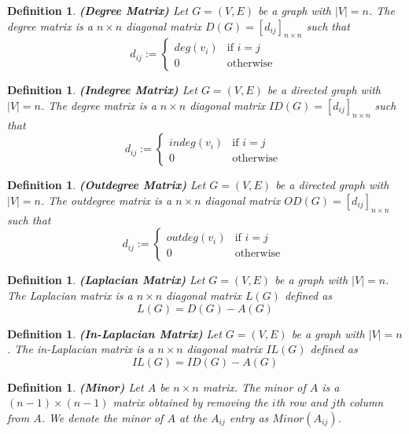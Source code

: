 \documentclass[twoside,11pt]{article}
\newtheorem{definition}[theorem]{Definition}
\numberwithin{equation}{section} \DeclareMathOperator{\Var}{Var}
\newcommand{\bdf}{\begin{definition}}
\newcommand{\edf}{\end{definition}}
\begin{document}
\bdf
{\bf (Degree Matrix)}
Let $G=(V,E)$ be a graph with $|V|=n$. The {\it degree matrix} is a $n\times n$ diagonal matrix $D(G) = [d_{ij}]_{n \times n}$ such that
\begin{displaymath}
d_{ij} :=  \left\{\begin{array}{ll} deg(v_i) & \textrm{if $i=j$ }
 \\ 0 & \textrm{otherwise }
\end{array}\right.
\end{displaymath}
\edf

\bdf
{\bf (Indegree Matrix)}
Let $G=(V,E)$ be a directed graph with $|V|=n$. The {\it degree matrix} is a $n\times n$ diagonal matrix $ID(G) = [d_{ij}]_{n \times n}$ such that
\begin{displaymath}
d_{ij} :=  \left\{\begin{array}{ll} indeg(v_i) & \textrm{if $i=j$ }
 \\ 0 & \textrm{otherwise }
\end{array}\right.
\end{displaymath}
\edf

\bdf
{\bf (Outdegree Matrix)}
Let $G=(V,E)$ be a directed graph with $|V|=n$. The {\it outdegree matrix} is a $n\times n$ diagonal matrix $OD(G) = [d_{ij}]_{n \times n}$ such that
\begin{displaymath}
d_{ij} :=  \left\{\begin{array}{ll} outdeg(v_i) & \textrm{if $i=j$ }
 \\ 0 & \textrm{otherwise }
\end{array}\right.
\end{displaymath}
\edf

\bdf
{\bf (Laplacian Matrix)}
Let $G=(V,E)$ be a graph with $|V|=n$. The {\it Laplacian matrix} is a $n\times n$ diagonal matrix $L(G)$ defined as
$$ L(G)=D(G)-A(G)  $$
\edf


\bdf
{\bf (In-Laplacian Matrix)}
Let $G=(V,E)$ be a graph with $|V|=n$. The {\it in-Laplacian matrix} is a $n\times n$ diagonal matrix $IL(G)$ defined as
$$ IL(G)=ID(G)-A(G)  $$
\edf

\bdf
{\bf (Minor)}
Let $A$ be $n\times n$ matrix. The minor of $A$ is a $(n-1)\times (n-1)$ matrix obtained by removing the $i$th row and $j$th column from $A$. We denote the minor of $A$ at the $A_{ij}$ entry as $Minor(A_{ij})$.
\edf

\end{document}
